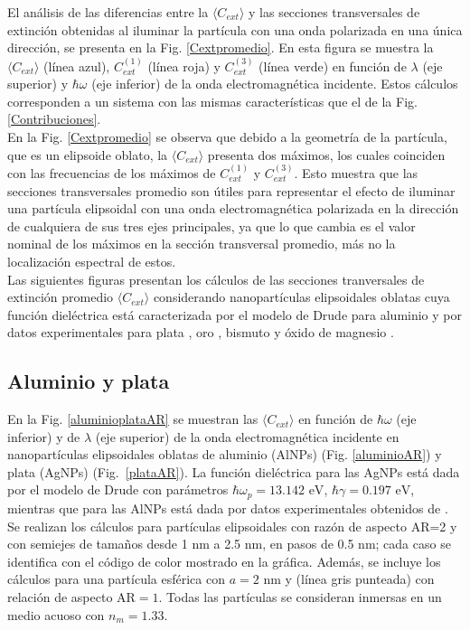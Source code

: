 El análisis de las diferencias entre la $\langle C_{ext}\rangle$ y  las secciones transversales de extinción obtenidas al iluminar la partícula con una onda polarizada en una única dirección, se presenta en la Fig. \ref{Cextpromedio}. En esta figura se muestra la $\langle C_{ext}\rangle$ (línea azul), $C_{ext}^{(1)}$ (línea roja) y $C_{ext}^{(3)}$ (línea verde) en función de $\lambda$ (eje superior) y $\hbar\omega$ (eje inferior) de la onda electromagnética incidente. Estos cálculos corresponden a un sistema con las mismas características que el de la Fig. \ref{Contribuciones}.\\

En la Fig. \ref{Cextpromedio} se observa que debido a la geometría de la partícula, que es un elipsoide oblato, la 
$\langle C_{ext}\rangle$ presenta dos máximos, los cuales coinciden con las frecuencias de los máximos de $C_{ext}^{(1)}$ y $C_{ext}^{(3)}$. Esto muestra que las secciones transversales promedio son útiles para representar el efecto de iluminar una partícula elipsoidal con una onda electromagnética polarizada en la dirección de cualquiera de sus tres ejes principales, ya que lo que cambia es el valor nominal de los máximos en la sección transversal promedio, más no la localización espectral de estos. \\

Las siguientes figuras presentan los cálculos de las secciones tranversales de extinción promedio  $\langle C_{ext}\rangle$ considerando nanopartículas elipsoidales oblatas cuya función dieléctrica está caracterizada por el modelo de Drude para aluminio \cite{Aluminio} y por datos experimentales para plata \cite{Plata}, oro \cite{Plata}, bismuto \cite{Bismuto} y  óxido de magnesio \cite{MgO}.


\subsection*{Aluminio y plata}
En la Fig. \ref{aluminioplataAR} se muestran las $\langle C_{ext}\rangle$ en función de $\hbar\omega$ (eje inferior) y de  $\lambda$ (eje superior) de la onda electromagnética incidente en nanopartículas elipsoidales oblatas de aluminio (AlNPs) (Fig. \ref{aluminioAR}) y plata (AgNPs) (Fig.~\ref{plataAR}). La función dieléctrica para las AgNPs está dada por el modelo de Drude con parámetros $\hbar\omega_p=13.142\text{ eV}$, $\hbar\gamma=0.197\text{ eV}$, mientras que para las AlNPs  está dada por datos experimentales obtenidos de \cite{Plata}. Se realizan los cálculos para partículas elipsoidales con razón de aspecto AR=2 y con semiejes de tamaños desde 1 nm a 2.5 nm, en pasos de 0.5 nm; cada caso se identifica con el código de color mostrado en la gráfica. Además, se incluye los cálculos para una partícula esférica con $a=2 \text{ nm}$ y (línea gris punteada) con relación de aspecto AR$=1$. Todas las partículas se consideran inmersas en un medio acuoso con $n_m=1.33$.\\

